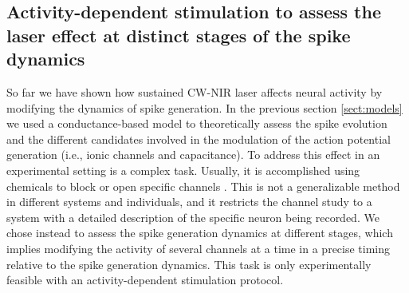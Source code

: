 \subsection{Activity-dependent stimulation to assess the laser effect at distinct stages of the spike dynamics} 
\label{sec:activity dependent}
So far we have shown how sustained CW-NIR laser affects neural activity by modifying the dynamics of spike generation. In the previous section \ref{sect:models} we used a conductance-based model to theoretically assess the spike evolution and the different candidates involved in the modulation of the action potential generation (i.e., ionic channels and capacitance). To address this effect in an experimental setting is a complex task. Usually, it is accomplished using chemicals to block or open specific channels \parencite{liang_temperature-dependent_2009}. This is not a generalizable method in different systems and individuals, and it restricts the channel study to a system with a detailed description of the specific neuron being recorded. We chose instead to assess the spike generation dynamics at different stages, which implies modifying the activity of several channels at a time in a precise timing relative to the spike generation dynamics. This task is only experimentally feasible with an activity-dependent stimulation protocol.
